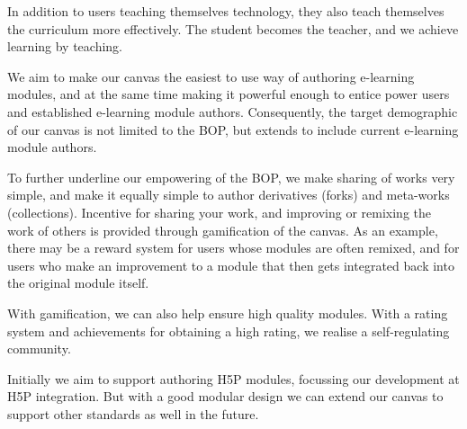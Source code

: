 In addition to users teaching themselves technology, they also teach 
themselves the curriculum more effectively. The student becomes the teacher, 
and we achieve learning by teaching.

We aim to make our canvas the easiest to use way of authoring e-learning 
modules, and at the same time making it powerful enough to entice power users 
and established e-learning module authors. Consequently, the target 
demographic of our canvas is not limited to the BOP, but extends to include 
current e-learning module authors.

To further underline our empowering of the BOP, we make sharing of works very 
simple, and make it equally simple to author derivatives (forks) and 
meta-works (collections). Incentive for sharing your work, and improving or 
remixing the work of others is provided through gamification of the canvas. As 
an example, there may be a reward system for users whose modules are often 
remixed, and for users who make an improvement to a module that then gets 
integrated back into the original module itself.

With gamification, we can also help ensure high quality modules. With a rating 
system and achievements for obtaining a high rating, we realise a 
self-regulating community.

Initially we aim to support authoring H5P modules, focussing our development 
at H5P integration. But with a good modular design we can extend our canvas to 
support other standards as well in the future.
